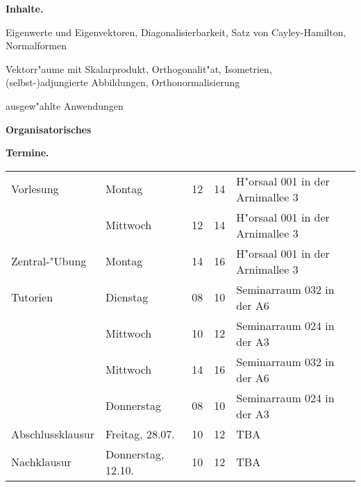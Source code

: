 \documentclass[a4,11pt]{article}
\begin{document}
{\bfseries Inhalte.}
\begin{compactitem}
\item Eigenwerte und Eigenvektoren, Diagonalisierbarkeit,
  Satz von Cayley-Hamilton, Normalformen
\item Vektorr"aume mit Skalarprodukt, Orthogonalit"at, Isometrien,
  (selbst-)adjungierte Abbildungen, Orthonormalisierung
\item ausgew"ahlte Anwendungen
\end{compactitem}

\mbox{}
\vfill

\begin{center}
  \LARGE \bfseries Organisatorisches
\end{center}

%
\bigskip

{\bfseries Termine.} %
%
\newline
\begin{tabular}[t]{llr@{--}ll}
  Vorlesung 
  & Montag      & 12&14 & H"orsaal %
  001 in der Arnimallee 3  \\
  & Mittwoch & 12&14 & H"orsaal 001 in der Arnimallee 3 \\
  Zentral-"Ubung  
  & Montag      &  14&16 & H"orsaal 001 in der Arnimallee 3 \\
  Tutorien
  & Dienstag & 08&10 & Seminarraum 032 in der A6 \\ %
  & Mittwoch & 10&12 & Seminarraum 024 in der A3 \\ %
  & Mittwoch & 14&16 & Seminarraum 032 in der A6 \\ %
  & Donnerstag & 08&10 & Seminarraum 024 in der A3 \\ %
  Abschlussklausur
  & Freitag, 28.07.  & 10&12 & TBA \\ %
  Nachklausur
  & Donnerstag, 12.10. & 10&12 & TBA \\ %
\end{tabular}
\bigskip
\end{document}

